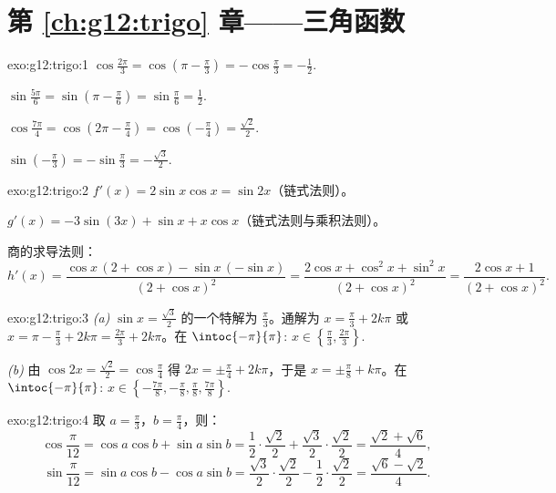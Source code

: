 \section*{第 \ref{ch:g12:trigo} 章——三角函数}

\begin{solution}{exo:g12:trigo:1}
$\cos\frac{2\pi}{3} = \cos\left(\pi - \frac\pi3\right) = -\cos\frac\pi3
= -\frac12$.

$\sin\frac{5\pi}{6} = \sin\left(\pi - \frac\pi6\right) = \sin\frac\pi6
= \frac12$.

$\cos\frac{7\pi}{4} = \cos\left(2\pi - \frac{\pi}{4}\right)
= \cos\left(-\frac\pi4\right) = \frac{\sqrt2}{2}$.

$\sin\left(-\frac\pi3\right) = -\sin\frac\pi3 = -\frac{\sqrt3}{2}$.
\end{solution}

\begin{solution}{exo:g12:trigo:2}
$f'(x) = 2\sin x\cos x = \sin 2x$（链式法则）。

$g'(x) = -3\sin(3x) + \sin x + x\cos x$（链式法则与乘积法则）。

商的求导法则：
\[
h'(x) = \frac{\cos x\,(2 + \cos x) - \sin x\,(-\sin x)}{(2+\cos x)^2}
= \frac{2\cos x + \cos^2 x + \sin^2 x}{(2+\cos x)^2}
= \frac{2\cos x + 1}{(2+\cos x)^2}.
\]
\end{solution}

\begin{solution}{exo:g12:trigo:3}
\emph{(a)}  $\sin x = \frac{\sqrt3}{2}$ 的一个特解为
$\frac\pi3$。通解为 $x = \frac\pi3 + 2k\pi$ 或
$x = \pi - \frac\pi3 + 2k\pi = \frac{2\pi}{3} + 2k\pi$。在
$\intoc{-\pi}{\pi}$: $x \in \left\{\frac\pi3, \frac{2\pi}{3}\right\}$.

\emph{(b)} 由 $\cos 2x = \frac{\sqrt2}{2} = \cos\frac\pi4$ 得
$2x = \pm\frac\pi4 + 2k\pi$，于是 $x = \pm\frac\pi8 + k\pi$。在
$\intoc{-\pi}{\pi}$:
$x \in \left\{-\frac{7\pi}{8}, -\frac\pi8, \frac\pi8, \frac{7\pi}{8}\right\}$.
\end{solution}

\begin{solution}{exo:g12:trigo:4}
取 $a = \frac\pi3$，$b = \frac\pi4$，则：
\[
\cos\frac{\pi}{12} = \cos a\cos b + \sin a \sin b
= \frac12\cdot\frac{\sqrt2}{2} + \frac{\sqrt3}{2}\cdot\frac{\sqrt2}{2}
= \frac{\sqrt2 + \sqrt6}{4},
\]
\[
\sin\frac{\pi}{12} = \sin a\cos b - \cos a \sin b
= \frac{\sqrt3}{2}\cdot\frac{\sqrt2}{2} - \frac12\cdot\frac{\sqrt2}{2}
= \frac{\sqrt6 - \sqrt2}{4}.
\]
\end{solution}

